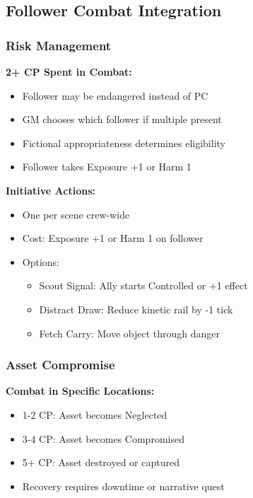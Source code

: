 \subsection{Follower Combat Integration}

\subsubsection{Risk Management}

\textbf{2+ CP Spent in Combat:}
\begin{itemize}[leftmargin=*]
    \item Follower may be endangered instead of PC
    \item GM chooses which follower if multiple present
    \item Fictional appropriateness determines eligibility
    \item Follower takes Exposure +1 or Harm 1
\end{itemize}

\textbf{Initiative Actions:}
\begin{itemize}[leftmargin=*]
    \item One per scene crew-wide
    \item Cost: Exposure +1 or Harm 1 on follower
    \item Options:
    \begin{itemize}
        \item Scout Signal: Ally starts Controlled or +1 effect
        \item Distract Draw: Reduce kinetic rail by -1 tick
        \item Fetch Carry: Move object through danger
    \end{itemize}
\end{itemize}

\subsubsection{Asset Compromise}

\textbf{Combat in Specific Locations:}
\begin{itemize}[leftmargin=*]
    \item 1-2 CP: Asset becomes Neglected
    \item 3-4 CP: Asset becomes Compromised
    \item 5+ CP: Asset destroyed or captured
    \item Recovery requires downtime or narrative quest
\end{itemize}

